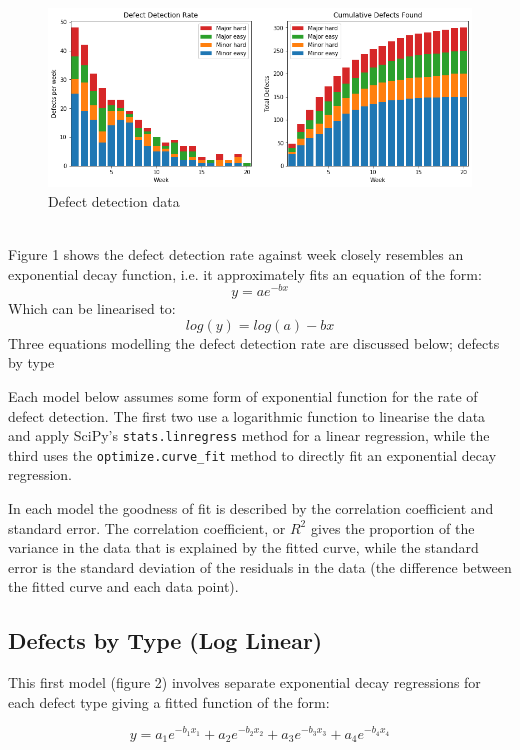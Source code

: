 \documentclass[12pt,a4paper]{article}
\begin{document}
		\begin{figure}[h]
			\centering
			\includegraphics[scale=0.6]{histogram}
			\caption{Defect detection data}
		\end{figure}

		
		\ \\
		
		Figure 1 shows the defect detection rate against week closely resembles an exponential decay function, i.e. it approximately fits an equation of the form:
		\[
			y = ae^{-bx}
		\]
		Which can be linearised to:
		\[
			log(y) = log(a) - b x
		\]
		Three equations modelling the defect detection rate are discussed below; defects by type
		
		Each model below assumes some form of exponential function for the rate of defect detection. The first two use a logarithmic function to linearise the data and apply SciPy's \texttt{stats.linregress} method for a linear regression, while the third uses the \texttt{optimize.curve\_fit} method to directly fit an exponential decay regression.
		
		In each model the goodness of fit is described by the correlation coefficient and standard error. The correlation coefficient, or $R^2$ gives the proportion of the variance in the data that is explained by the fitted curve, while the standard error is the standard deviation of the residuals in the data (the difference between the fitted curve and each data point).
		
	\subsection{Defects by Type (Log Linear)}
		This first model (figure 2) involves separate exponential decay regressions for each defect type giving a fitted function of the form:
		
		\[
			y = a_1 e ^ {-b_1 x_1}  
			  + a_2 e ^ {-b_2 x_2} + a_3 e ^ {-b_3 x_3} + a_4 e ^ {-b_4 x_4}
		\]		
		
\end{document}
